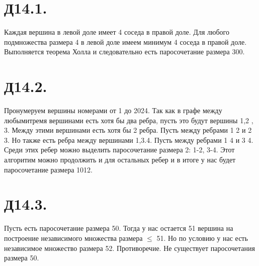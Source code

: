 

	\section*{Д14.1.}
	Каждая вершина в левой доле имеет 4 соседа в правой доле. Для любого подмножества размера 4 в левой доле имеем минимум 4 соседа в правой доле. Выполняется теорема Холла и следовательно есть паросочетание размера 300. 
	\section*{Д14.2.}
	Пронумеруем вершины номерами от 1 до 2024. Так как в графе между любымитремя вершинами есть хотя бы два ребра, пусть это будут вершины 1,2 , 3. Между этими вершинами есть хотя бы 2 ребра.  Пусть между ребрами 1 2 и 2 3. Но также есть ребра между вершинами 1,3.4. Пусть между ребрами 1 4 и 3 4.  Среди этих ребер можно выделить паросочетание размера 2: 1-2, 3-4. Этот алгоритим можно продолжить и для остальных ребер и в итоге у нас будет паросочетание размера 1012.
	\section*{Д14.3.}
	Пусть есть паросочетание размера 50. Тогда у нас остается 51 вершина на построение независимого множества размера $\leqslant$ 51. Но по условию у нас есть независимое множество размера 52. Противоречие. Не существует паросочетания размера 50. 
